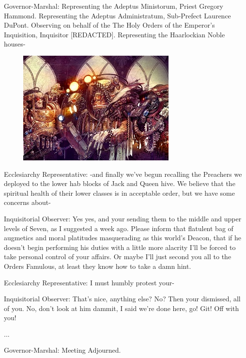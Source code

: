 Governor-Marshal: 
Representing the Adeptus Ministorum, Priest Gregory Hammond. 
Representing the Adeptus Administratum, Sub-Prefect Laurence DuPont. 
Observing on behalf of the The Holy Orders of the Emperor's Inquisition, Inquisitor [REDACTED]. 
Representing the Haarlockian Noble houses-



\begin{figure}
	\begin{center}
		\includegraphics[width=\figwidth]{pics/20/2.png}
	\end{center}
\end{figure}



Ecclesiarchy Representative: 
-and finally we've begun recalling the Preachers we deployed to the lower hab blocks of Jack and Queen hive. 
We believe that the spiritual health of their lower classes is in acceptable order, but we have some concerns about-

Inquisitorial Observer: 
Yes yes, and your sending them to the middle and upper levels of Seven, as I suggested a week ago. 
Please inform that flatulent bag of augmetics and moral platitudes masquerading as this world's Deacon, that if he doesn't begin performing his duties with a little more alacrity I'll be forced to take personal control of your affairs. 
Or maybe I'll just second you all to the Orders Famulous, at least they know how to take a damn hint.

Ecclesiarchy Representative: 
I must humbly protest your-

Inquisitorial Observer: 
That's nice, anything else? 
No? 
Then your dismissed, all of you. 
No, don't look at him dammit, I said we're done here, go! 
Git! 
Off with you!

...

Governor-Marshal: 
Meeting Adjourned.

